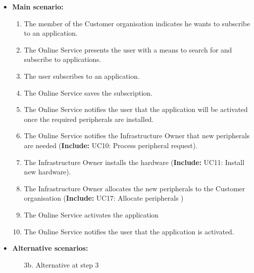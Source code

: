 \begin{itemize}
        
    \item \textbf{Main scenario:} 
    \begin{enumerate}
       \item The member of the Customer organisation indicates he wants to subscribe to an application.
       \item The Online Service presents the user with a means to search for and subscribe to applications.
       \item The user subscribes to an application.
	\item The Online Service saves the subscription.
	\item The Online Service notifies the user that the application will be activated once the required peripherals are installed.
	\item The Online Service notifies the Infrastructure Owner that new peripherals are needed (\textbf{Include:} UC10: Process peripheral request).
	\item The Infrastructure Owner installs the hardware (\textbf{Include:} UC11: Install new hardware).
    \item The Infrastructure Owner allocates the new peripherals to the Customer organisation (\textbf{Include:} UC17: Allocate peripherals )
	\item The Online Service activates the application
	\item The Online Service notifies the user that the application is activated.
    \end{enumerate}

    \item \textbf{Alternative scenarios:} 
    \begin{enumerate}
        \item [3b.] Alternative at step 3
    \end{enumerate}
\end{itemize}


